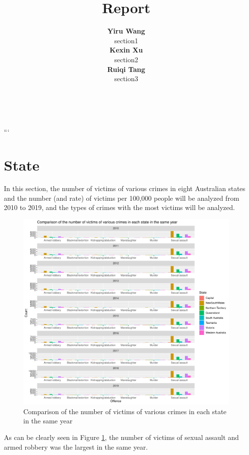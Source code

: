 \documentclass[11pt,a4paper,]{article}
\title{Report}
\author{\sf\Large\textbf{ Yiru Wang}\\ {\sf\large section1\\[0.5cm]} \sf\Large\textbf{ Kexin Xu}\\ {\sf\large section2\\[0.5cm]} \sf\Large\textbf{ Ruiqi Tang}\\ {\sf\large section3\\[0.5cm]}}
\date{\sf\Date~\Month~\Year}
\makeatletter
\def\titlepage{\front{\expandafter{\@title}}{\@author}{\@organization}}
\makeatother
\begin{document}
\titlepage

```

\clearpage

\section*{State}

In this section, the number of victims of various crimes in eight Australian states and the number (and rate) of victims per 100,000 people will be analyzed from 2010 to 2019, and the types of crimes with the most victims will be analyzed.

\begin{figure}
\centering
\includegraphics{report_files/figure-latex/plot1-1.pdf}
\caption{\label{fig:plot1}Comparison of the number of victims of various crimes in each state in the same year}
\end{figure}

As can be clearly seen in Figure \ref{fig:plot1}, the number of victims of sexual assault and armed robbery was the largest in the same year.
\end{document}
